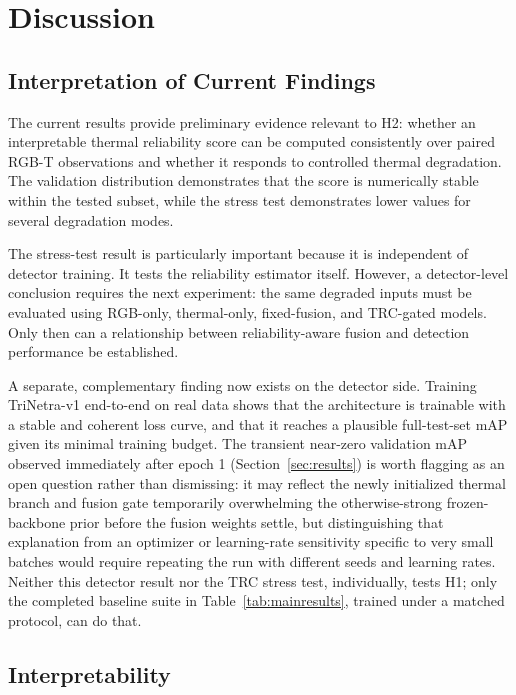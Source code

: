 \documentclass[conference]{IEEEtran}
\begin{document}
\section{Discussion}

\subsection{Interpretation of Current Findings}

The current results provide preliminary evidence relevant to H2: whether an interpretable thermal reliability score can be computed consistently over paired RGB-T observations and whether it responds to controlled thermal degradation. The validation distribution demonstrates that the score is numerically stable within the tested subset, while the stress test demonstrates lower values for several degradation modes.

The stress-test result is particularly important because it is independent of detector training. It tests the reliability estimator itself. However, a detector-level conclusion requires the next experiment: the same degraded inputs must be evaluated using RGB-only, thermal-only, fixed-fusion, and TRC-gated models. Only then can a relationship between reliability-aware fusion and detection performance be established.

A separate, complementary finding now exists on the detector side. Training TriNetra-v1 end-to-end on real data shows that the architecture is trainable with a stable and coherent loss curve, and that it reaches a plausible full-test-set mAP given its minimal training budget. The transient near-zero validation mAP observed immediately after epoch 1 (Section~\ref{sec:results}) is worth flagging as an open question rather than dismissing: it may reflect the newly initialized thermal branch and fusion gate temporarily overwhelming the otherwise-strong frozen-backbone prior before the fusion weights settle, but distinguishing that explanation from an optimizer or learning-rate sensitivity specific to very small batches would require repeating the run with different seeds and learning rates. Neither this detector result nor the TRC stress test, individually, tests H1; only the completed baseline suite in Table~\ref{tab:mainresults}, trained under a matched protocol, can do that.

\subsection{Interpretability}
\end{document}
